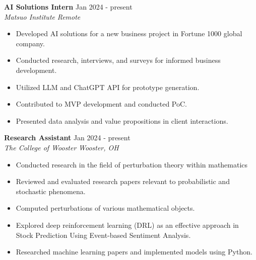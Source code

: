 \documentclass[a4paper,12pt]{article}
\begin{document}
\textbf{\large AI Solutions Intern} \hfill \textnormal{Jan 2024 - present}\\
\textit{Matsuo Institute} \hfill \textit{Remote}
\begin{itemize}
    \item Developed AI solutions for a new business project in Fortune 1000 global company.
    \item Conducted research, interviews, and surveys for informed business development.
    \item Utilized LLM and ChatGPT API for prototype generation.
    \item Contributed to MVP development and conducted PoC.
    \item Presented data analysis and value propositions in client interactions.
\end{itemize}
\textbf{\large Research Assistant} \hfill \textnormal{Jan 2024 - present}\\
\textit{The College of Wooster} \hfill \textit{Wooster, OH}
\begin{itemize}
    \item Conducted research in the field of perturbation theory within mathematics
    \item Reviewed and evaluated research papers relevant to probabilistic and stochastic phenomena.
    \item Computed perturbations of various mathematical objects.
    \item Explored deep reinforcement learning (DRL) as an effective approach in Stock Prediction Using Event-based Sentiment Analysis.
    \item Researched machine learning papers and implemented models using Python.
\end{itemize}
\end{document}

